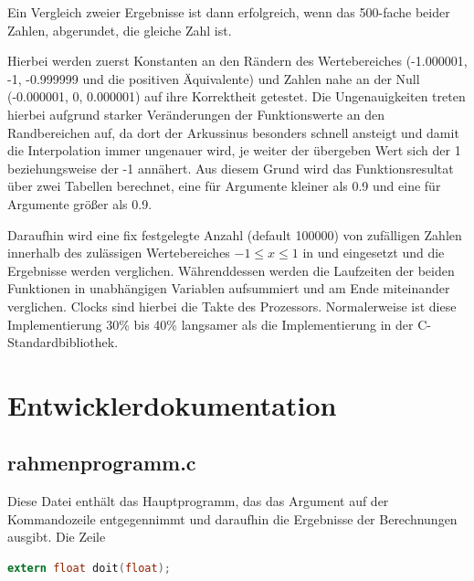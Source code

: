 \documentclass{article}
\begin{document}
	Ein Vergleich zweier Ergebnisse ist dann erfolgreich, wenn das
	500-fache beider Zahlen, abgerundet, die gleiche Zahl ist.

	\vspace{0.3cm}

	Hierbei werden zuerst Konstanten an den Rändern des
	Wertebereiches (-1.000001, -1, -0.999999 und die positiven
	Äquivalente) und Zahlen nahe an der Null (-0.000001, 0,
	0.000001) auf ihre Korrektheit getestet. Die Ungenauigkeiten
	treten hierbei aufgrund starker Veränderungen der Funktionswerte
	an den Randbereichen auf, da dort der Arkussinus besonders
	schnell ansteigt und damit die Interpolation immer ungenauer
	wird, je weiter der übergeben Wert sich der 1 beziehungsweise
	der -1 annähert. Aus diesem Grund wird das Funktionsresultat
	über zwei Tabellen berechnet, eine für Argumente kleiner
	als 0.9 und eine für Argumente größer als 0.9.

	\vspace{0.3cm}

	Daraufhin wird eine fix festgelegte Anzahl (default 100000)
	von zufälligen Zahlen innerhalb des zulässigen Wertebereiches
	\(-1\leq x \leq 1\) in  und 
	eingesetzt und die Ergebnisse werden verglichen. Währenddessen
	werden die Laufzeiten der beiden Funktionen in unabhängigen
	Variablen aufsummiert und am Ende miteinander verglichen.
	Clocks sind hierbei die Takte des Prozessors. Normalerweise
	ist diese Implementierung 30\% bis 40\% langsamer als die
	Implementierung in der C-Standardbibliothek.

\newpage

\section{Entwicklerdokumentation}

\subsection{rahmenprogramm.c}

	Diese Datei enthält das Hauptprogramm, das das Argument auf der
	Kommandozeile entgegennimmt und daraufhin die Ergebnisse der
	Berechnungen ausgibt. Die Zeile

\vspace{0.3cm}


\begin{lstlisting}[language=c,style=c]
extern float doit(float);
\end{lstlisting}
\end{document}
